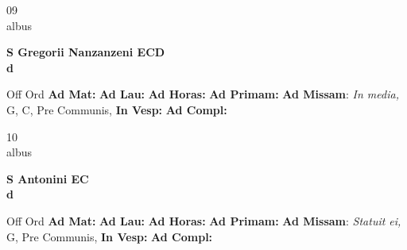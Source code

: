 \documentclass[10pt, openany]{book}
\begin{document}
    \begin{center}
        \begin{minipage}{3.5in}
            \vspace{2em}
            \begin{minipage}{0.5in}
                {\Huge 09} \\
                {\normalsize albus}
            \end{minipage}
            \begin{minipage}{3.0in}
                \textbf{ \large S Gregorii Nanzanzeni ECD \\
                \textnormal{\normalsize d}}

            \end{minipage}
            \begin{justify}Off Ord
                \textbf{Ad Mat: }
                \textbf{Ad Lau: }
                \textbf{Ad Horas: }
                \textbf{Ad Primam: }\textbf{Ad Missam}: \textit{In media,} G, C, Pre Communis, 
                \textbf{In Vesp: }
                \textbf{Ad Compl: }
            \end{justify}
        \end{minipage}
    \end{center}

    \begin{center}
        \begin{minipage}{3.5in}
            \vspace{2em}
            \begin{minipage}{0.5in}
                {\Huge 10} \\
                {\normalsize albus}
            \end{minipage}
            \begin{minipage}{3.0in}
                \textbf{ \large S Antonini EC \\
                \textnormal{\normalsize d}}

            \end{minipage}
            \begin{justify}Off Ord
                \textbf{Ad Mat: }
                \textbf{Ad Lau: }
                \textbf{Ad Horas: }
                \textbf{Ad Primam: }\textbf{Ad Missam}: \textit{Statuit ei,} G, Pre Communis, 
                \textbf{In Vesp: }
                \textbf{Ad Compl: }
            \end{justify}
        \end{minipage}
    \end{center}
\end{document}
